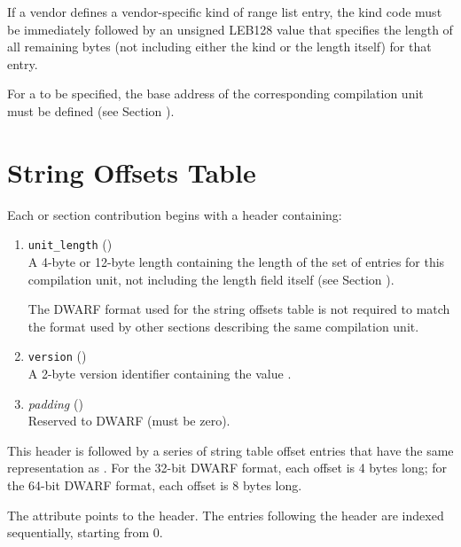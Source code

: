 \bb
If a vendor defines a vendor-specific kind of range list
entry, the kind code must be immediately followed by an
unsigned LEB128 value that specifies the length of all
remaining bytes (not including either the kind or the length
itself) for that entry.
\eb

For a  to be specified, the base address of the
corresponding compilation unit must be defined 
(see Section ).

\section{String Offsets Table}
\label{chap:stringoffsetstable}
Each 
\bb
\dotdebugstroffsets{} or \dotdebugstroffsetsdwo{} section
contribution
\eb
begins with a header containing:
\begin{enumerate}[1. ]
\item \texttt{unit\_length} () \\
A 4-byte or 12-byte length containing the length of
the set of entries for this compilation unit, not
including the length field itself
\bb
(see Section ).
\eb

\bb
The DWARF format used for the string offsets table is not required to match
the format used by other sections describing the same compilation unit.
\eb

\item  \texttt{version} (\HFTuhalf) \\
A 2-byte version identifier containing the value
\versiondotdebugstroffsets{}.

\item \textit{padding} (\HFTuhalf) \\
Reserved to DWARF (must be zero).
\end{enumerate}

This header is followed by a series of string table 
\bb
offset entries
\eb
that have the same representation as \DWFORMstrp.
For the 32-bit DWARF format, each offset is 4 bytes long; for
the 64-bit DWARF format, each offset is 8 bytes long.

The 
\bb
\DWATstroffsets{} attribute points to the header.
\eb
The entries following the header are indexed sequentially,
\db
starting from 0.

